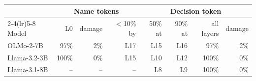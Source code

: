 \begin{tabular}{@{}lrrrrrrr@{}}
\toprule
& \multicolumn{3}{c}{Name tokens} & \multicolumn{4}{c}{Decision token} \\ \cmidrule(lr){2-4}\cmidrule(lr){5-8}
Model & L0 & damage & $<$10\% by & 50\% at & 90\% at & all layers & damage \\
\midrule
OLMo-2-7B & 97\% & 2\% & L17 & L15 & L16 & 97\% & 2\% \\
Llama-3.2-3B & 100\% & 0\% & L15 & L10 & L12 & 100\% & 0\% \\
Llama-3.1-8B & -- & -- & -- & L8 & L9 & 100\% & 0\% \\
\bottomrule
\end{tabular}
